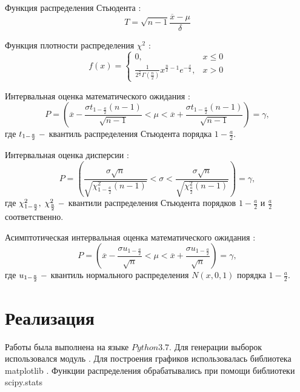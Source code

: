 \documentclass[12pt]{article}
\begin{document}
Функция распределения Стьюдента \cite{8_2}:
\begin{equation}
    T = \sqrt{n-1}\frac{\overline{x}-\mu}{\delta}
\end{equation}

Функция плотности распределения $\chi^2$ \cite{8_3}:
\begin{equation}
    f(x) = \begin{cases}
    0,&x\leq 0\\
    \frac{1}{2^\frac{n}{2}\Gamma\left(\frac{n}{2}\right)}x^{\frac{n}{2}-1}e^{-\frac{x}{2}},& x>0
    \end{cases}
\end{equation}

Интервальная оценка математического ожидания \cite{8_4}:
\begin{equation}
    P=\left(\overline{x}-\frac{\sigma t_{1-\frac{a}{2}}(n-1)}{\sqrt{n-1}}<\mu<\overline{x}+\frac{\sigma t_{1-\frac{a}{2}}(n-1)}{\sqrt{n-1}}\right) = \gamma,
\end{equation}
где $t_{1-\frac{a}{2}}\;\--$ квантиль распределения Стьюдента порядка $1-\frac{a}{2}.$

Интервальная оценка дисперсии \cite{8_2}:
\begin{equation}
    P=\left(\frac{\sigma\sqrt{n}}{\sqrt{\chi^2_{1-\frac{a}{2}}(n-1)}}<\sigma<\frac{\sigma\sqrt{n}}{\sqrt{\chi^2_\frac{a}{2}(n-1)}}\right) = \gamma,
\end{equation}
где $\chi_{1-\frac{a}{2}}^2,\;\chi_\frac{a}{2}^2\;\--$ квантили распределения Стьюдента порядков $1-\frac{a}{2}$ и $\frac{a}{2}$ соответственно.

Асимптотическая интервальная оценка математического ожидания \cite{8_2}:
\begin{equation}
    P = \left(\overline{x}-\frac{\sigma u_{1-\frac{a}{2}}}{\sqrt{n}}<\mu<\overline{x}+\frac{\sigma u_{1-\frac{a}{2}}}{\sqrt{n}}\right)=\gamma,
\end{equation}
где $u_{1-\frac{a}{2}}\;\--$ квантиль нормального распределения $N(x,0,1)$ порядка $1-\frac{a}{2}.$


\section{Реализация}
Работы была выполнена на языке $Python 3.7.$
Для генерации выборок использовался модуль \cite{numpy}.
Для построения графиков использовалась библиотека matplotlib \cite{plotlib}.
Функции распределения обрабатывались при помощи библиотеки scipy.stats \cite{skp}
\end{document}
